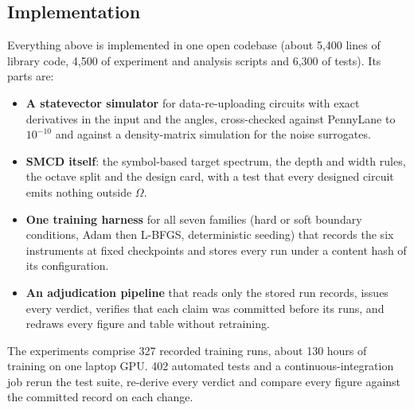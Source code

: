\subsection{Implementation}
\label{sec:implementation}
Everything above is implemented in one open codebase (about 5{,}400 lines of library
code, 4{,}500 of experiment and analysis scripts and 6{,}300 of tests). Its parts are:
\begin{itemize}
  \item \textbf{A statevector simulator} for data-re-uploading circuits with exact
    derivatives in the input and the angles, cross-checked against PennyLane to
    $10^{-10}$ and against a density-matrix simulation for the noise surrogates.
  \item \textbf{SMCD itself}: the symbol-based target spectrum, the depth and width
    rules, the octave split and the design card, with a test that every designed circuit
    emits nothing outside $\Omega$.
  \item \textbf{One training harness} for all seven families (hard or soft boundary
    conditions, Adam then L-BFGS, deterministic seeding) that records the six instruments
    at fixed checkpoints and stores every run under a content hash of its configuration.
  \item \textbf{An adjudication pipeline} that reads only the stored run records, issues
    every verdict, verifies that each claim was committed before its runs, and redraws
    every figure and table without retraining.
\end{itemize}
The experiments comprise 327 recorded training runs, about 130 hours of training on one
laptop GPU. 402 automated tests and a continuous-integration job rerun the test suite,
re-derive every verdict and compare every figure against the committed record on each
change.
